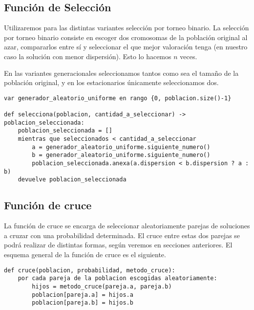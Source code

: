 \begin{minipage}{\textwidth}

	\subsection{Función de Selección}

	Utilizaremos para las distintas variantes selección por torneo binario. La selección por torneo binario
	consiste en escoger dos cromosomas de la población original al azar, compararlos entre sí y seleccionar el
	que mejor valoración tenga (en nuestro caso la solución con menor dispersión). Esto lo hacemos $n$ veces.
	
	En las variantes generacionales seleccionamos tantos como sea el tamaño de la población original, y en los
	estacionarios únicamente seleccionamos dos.
	
\begin{lstlisting}[mathescape=true,caption={Definición de la función de selección.},captionpos=b]
var generador_aleatorio_uniforme en rango {0, poblacion.size()-1}

def selecciona(poblacion, cantidad_a_seleccionar) -> poblacion_seleccionada:
	poblacion_seleccionada = []
	mientras que seleccionados < cantidad_a_seleccionar
		a = generador_aleatorio_uniforme.siguiente_numero()
		b = generador_aleatorio_uniforme.siguiente_numero()
		poblacion_seleccionada.anexa(a.dispersion < b.dispersion ? a : b)
	devuelve poblacion_seleccionada
\end{lstlisting}
\end{minipage}

\subsection{Función de cruce}

La función de cruce se encarga de seleccionar aleatoriamente parejas de soluciones a cruzar
con una probabilidad determinada. El cruce entre estas dos parejas se podrá realizar de distintas
formas, según veremos en secciones anteriores. El esquema general de la función de cruce es el siguiente.

\begin{minipage}{\textwidth}
\begin{lstlisting}[mathescape=true,caption={Esquema general de la función de cruce.},captionpos=b]
def cruce(poblacion, probabilidad, metodo_cruce):
	por cada pareja de la poblacion escogidas aleatoriamente:
		hijos = metodo_cruce(pareja.a, pareja.b)
		poblacion[pareja.a] = hijos.a
		poblacion[pareja.b] = hijos.b
\end{lstlisting}
\end{minipage}

